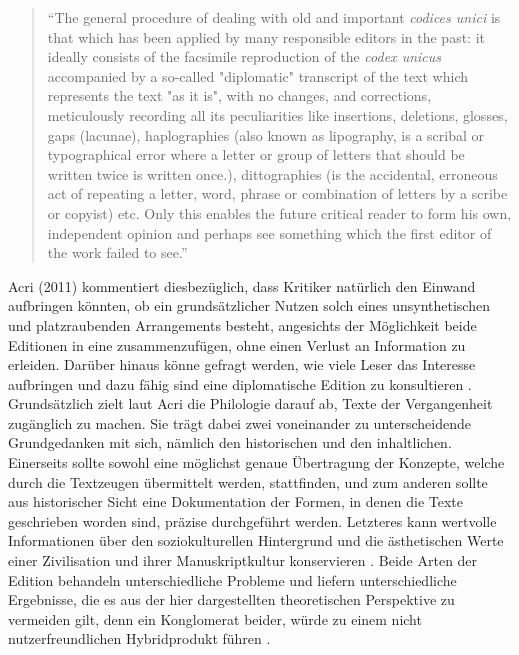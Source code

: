 \documentclass[a4paper,12pt]{article}
\begin{document}
{\begin{quote}  
``The general procedure of dealing with old and important \textit{codices unici} is that which has been applied by many responsible editors in the past: it ideally consists of the facsimile reproduction of the \textit{codex unicus} accompanied by a so-called "diplomatic" transcript of the text which represents the text "as it is", with no changes, and corrections, meticulously recording all its peculiarities like insertions, deletions, glosses, gaps (lacunae), haplographies (also known as lipography, is a scribal or typographical error where a letter or group of letters that should be written twice is written once.), dittographies (is the accidental, erroneous act of repeating a letter, word, phrase or combination of letters by a scribe or copyist) etc. Only this enables the future critical reader to form his own, independent opinion and perhaps see something which the first editor of the work failed to see.'' \parencite[52]{hahn2001} 
\end{quote}

Acri (2011) kommentiert diesbezüglich, dass Kritiker natürlich den Einwand aufbringen könnten, ob ein grundsätzlicher Nutzen solch eines unsynthetischen und platzraubenden Arrangements besteht, angesichts der Möglichkeit beide Editionen in eine zusammenzufügen, ohne einen Verlust an Information zu erleiden. Darüber hinaus könne gefragt werden, wie viele Leser das Interesse aufbringen und dazu fähig sind eine diplomatische Edition zu konsultieren \parencite[82]{acri2011dharma}. Grundsätzlich zielt laut Acri die Philologie darauf ab, Texte der Vergangenheit zugänglich zu machen. Sie trägt dabei zwei voneinander zu unterscheidende Grundgedanken mit sich, nämlich den historischen und den inhaltlichen. Einerseits sollte sowohl eine möglichst genaue Übertragung der Konzepte, welche durch die Textzeugen übermittelt werden, stattfinden, und zum anderen sollte aus historischer Sicht eine Dokumentation der Formen, in denen die Texte geschrieben worden sind, präzise durchgeführt werden. Letzteres kann wertvolle Informationen über den soziokulturellen Hintergrund und die ästhetischen Werte einer Zivilisation und ihrer Manuskriptkultur konservieren \parencite[82]{acri2011dharma}. Beide Arten der Edition behandeln unterschiedliche Probleme und liefern unterschiedliche Ergebnisse, die es aus der hier dargestellten theoretischen Perspektive zu vermeiden gilt, denn ein Konglomerat beider, würde zu einem nicht nutzerfreundlichen Hybridprodukt führen \parencite[81]{acri2011dharma}.

}
\end{document}
